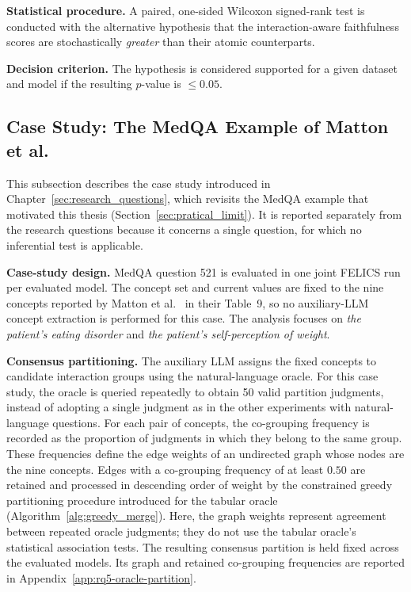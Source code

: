\noindent\textbf{Statistical procedure.} A paired, one-sided Wilcoxon signed-rank test is conducted with the alternative hypothesis that the interaction-aware faithfulness scores are stochastically \emph{greater} than their atomic counterparts.

\noindent\textbf{Decision criterion.} The hypothesis is considered supported for a given dataset and model if the resulting $p$-value is $\le 0.05$.

\subsection{Case Study: The MedQA Example of Matton et al.}
\label{sec:motivating_methodology}
This subsection describes the case study introduced in Chapter~\ref{sec:research_questions}, which revisits the MedQA example that motivated this thesis (Section~\ref{sec:pratical_limit}). It is reported separately from the research questions because it concerns a single question, for which no inferential test is applicable.

\noindent\textbf{Case-study design.} MedQA question 521 is evaluated in one joint FELICS run per evaluated model. The concept set and current values are fixed to the nine concepts reported by Matton et al.~\cite{mattonWalkTalkMeasuring2024} in their Table~9, so no auxiliary-LLM concept extraction is performed for this case. The analysis focuses on \textit{the patient's eating disorder} and \textit{the patient's self-perception of weight}.

\noindent\textbf{Consensus partitioning.} The auxiliary LLM assigns the fixed concepts to candidate interaction groups using the natural-language oracle. For this case study, the oracle is queried repeatedly to obtain 50 valid partition judgments, instead of adopting a single judgment as in the other experiments with natural-language questions. For each pair of concepts, the co-grouping frequency is recorded as the proportion of judgments in which they belong to the same group. These frequencies define the edge weights of an undirected graph whose nodes are the nine concepts. Edges with a co-grouping frequency of at least $0.50$ are retained and processed in descending order of weight by the constrained greedy partitioning procedure introduced for the tabular oracle (Algorithm~\ref{alg:greedy_merge}). Here, the graph weights represent agreement between repeated oracle judgments; they do not use the tabular oracle's statistical association tests. The resulting consensus partition is held fixed across the evaluated models. Its graph and retained co-grouping frequencies are reported in Appendix~\ref{app:rq5-oracle-partition}.

